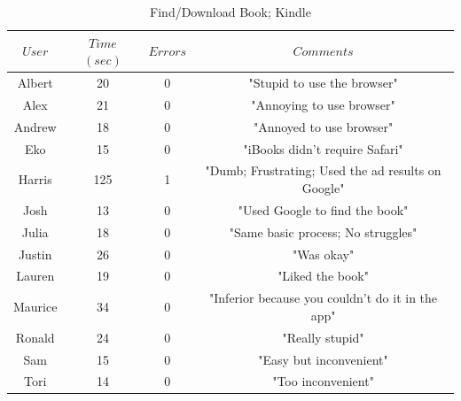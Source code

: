 \documentclass[11pt, oneside]{article}
\begin{document}
\begin{table}[!hbt]
\begin{center}
\caption{Find/Download Book; Kindle}
\label{tab:task3learnKindle}
\begin{tabular}{|c|c|c|c|}
\hline
$User$ & $Time$ $(sec)$ & $Errors$ & $Comments$\\
\hline
Albert & 20 & 0 & "Stupid to use the browser"\\
\hline
Alex & 21 & 0 & "Annoying to use browser"\\
\hline
Andrew & 18 & 0 & "Annoyed to use browser"\\
\hline
Eko & 15 & 0 & "iBooks didn't require Safari"\\
\hline
Harris & 125 & 1 & "Dumb; Frustrating; Used the ad results on Google"\\
\hline
Josh & 13 & 0 & "Used Google to find the book"\\
\hline
Julia & 18 & 0 & "Same basic process; No struggles"\\
\hline
Justin & 26 & 0 & "Was okay"\\
\hline
Lauren & 19 & 0 & "Liked the book"\\
\hline
Maurice & 34 & 0 & "Inferior because you couldn't do it in the app"\\
\hline
Ronald & 24 & 0 & "Really stupid"\\
\hline
Sam & 15 & 0 & "Easy but inconvenient"\\
\hline
Tori & 14 & 0 & "Too inconvenient"\\
\hline
\end{tabular}
\end{center}
\end{table}
\end{document}
